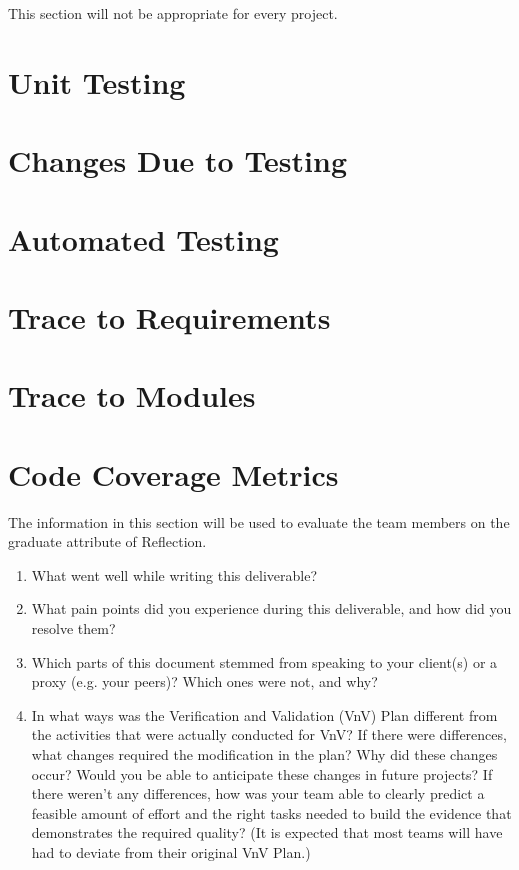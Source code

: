 \documentclass[12pt, titlepage]{article}
\begin{document}
This section will not be appropriate for every project.

\section{Unit Testing}

\section{Changes Due to Testing}

 \cite{Barfoot2017}

\section{Automated Testing}
		
\section{Trace to Requirements}
		
\section{Trace to Modules}		

\section{Code Coverage Metrics}




\newpage{}

The information in this section will be used to evaluate the team members on the
graduate attribute of Reflection.

\begin{enumerate}
  \item What went well while writing this deliverable? 
  \item What pain points did you experience during this deliverable, and how
    did you resolve them?
  \item Which parts of this document stemmed from speaking to your client(s) or
  a proxy (e.g. your peers)? Which ones were not, and why?
  \item In what ways was the Verification and Validation (VnV) Plan different
  from the activities that were actually conducted for VnV?  If there were
  differences, what changes required the modification in the plan?  Why did
  these changes occur?  Would you be able to anticipate these changes in future
  projects?  If there weren't any differences, how was your team able to clearly
  predict a feasible amount of effort and the right tasks needed to build the
  evidence that demonstrates the required quality?  (It is expected that most
  teams will have had to deviate from their original VnV Plan.)
\end{enumerate}
\end{document}
